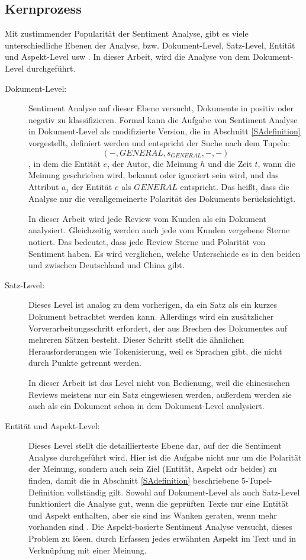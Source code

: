 \subsection{Kernprozess} \label{SAkernprozess}
Mit zustimmender Popularität der Sentiment Analyse, gibt es viele unterschiedliche Ebenen der Analyse, \ac{bzw.} Dokument-Level, Satz-Level, Entität und Aspekt-Level \ac{usw} \citep{Balazs2016}. In dieser Arbeit, wird die Analyse von dem Dokument-Level durchgeführt.
\begin{description}
	\item[Dokument-Level:] Sentiment Analyse auf dieser Ebene versucht, Dokumente in positiv oder negativ zu klassifizieren. Formal kann die Aufgabe von Sentiment Analyse in Dokument-Level als modifizierte Version, die in Abschnitt \ref{SAdefinition} vorgestellt, definiert werden und entspricht der Suche nach dem Tupeln:
$$(-,GENERAL,s_{GENERAL},-,-)$$
, in dem die Entität $e$, der Autor, die Meinung $h$ und die Zeit $t$, wann die Meinung geschrieben wird, bekannt oder ignoriert sein wird, und das Attribut $a_j$ der Entität $e$ als $GENERAL$ entspricht. Das heißt, dass die Analyse nur die verallgemeinerte Polarität des Dokuments berücksichtigt. \citep{Balazs2016}

In dieser Arbeit wird jede Review vom Kunden als ein Dokument analysiert. Gleichzeitig werden auch jede vom Kunden vergebene Sterne notiert. Das bedeutet, dass jede Review Sterne und Polarität von Sentiment haben. Es wird verglichen, welche Unterschiede es in den beiden und zwischen Deutschland und China gibt.
	\item[Satz-Level:] Dieses Level ist analog zu dem vorherigen, da ein Satz als ein kurzes Dokument betrachtet werden kann. Allerdings wird ein zusätzlicher Vorverarbeitungsschritt erfordert, der aus Brechen des Dokumentes auf mehreren Sätzen besteht. Dieser Schritt stellt die ähnlichen Herausforderungen wie Tokenisierung, weil es Sprachen gibt, die nicht durch Punkte getrennt werden. \citep{Balazs2016}

In dieser Arbeit ist das Level nicht von Bedienung, weil die chinesischen Reviews meistens nur ein Satz eingewiesen werden, außerdem werden sie auch als ein Dokument schon in dem Dokument-Level analysiert. 
	\item[Entität und Aspekt-Level:] Dieses Level stellt die detaillierteste Ebene dar, auf der die Sentiment Analyse durchgeführt wird. Hier ist die Aufgabe nicht nur um die Polarität der Meinung, sondern auch sein Ziel (Entität, Aspekt odr beides) zu finden, damit die in Abschnitt \ref{SAdefinition} beschriebene 5-Tupel-Definition vollständig gilt. Sowohl auf Dokument-Level als auch Satz-Level funktioniert die Analyse gut, wenn die geprüften Texte nur eine Entität und Aspekt enthalten, aber sie sind ins Wanken geraten, wenn mehr vorhanden sind \citep{Feldman:2013:TAS:2436256.2436274}. Die Aspekt-basierte Sentiment Analyse versucht, dieses Problem zu lösen, durch Erfassen jedes erwähnten Aspekt im Text und in Verknüpfung mit einer Meinung. \citep{Balazs2016}


\end{description}
